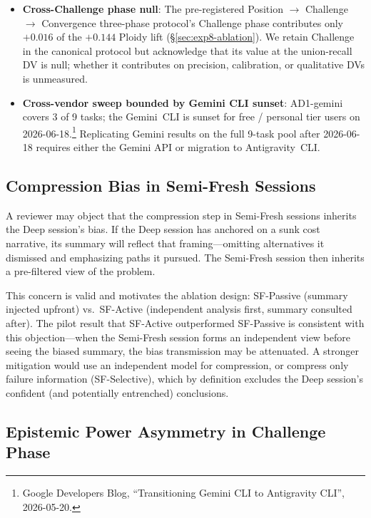 \documentclass[11pt]{article}
\begin{document}
\begin{itemize}[leftmargin=1.5em]
  \item \textbf{Cross-Challenge phase null}: The pre-registered Position $\to$ Challenge $\to$ Convergence three-phase protocol's Challenge phase contributes only $+0.016$ of the $+0.144$ Ploidy lift (\S\ref{sec:exp8-ablation}). We retain Challenge in the canonical protocol but acknowledge that its value at the union-recall DV is null; whether it contributes on precision, calibration, or qualitative DVs is unmeasured.
  \item \textbf{Cross-vendor sweep bounded by Gemini CLI sunset}: AD1-gemini covers 3 of 9 tasks; the Gemini~CLI is sunset for free / personal tier users on 2026-06-18.\footnote{Google Developers Blog, ``Transitioning Gemini CLI to Antigravity CLI'', 2026-05-20.} Replicating Gemini results on the full 9-task pool after 2026-06-18 requires either the Gemini API or migration to Antigravity~CLI.
\end{itemize}

\subsection{Compression Bias in Semi-Fresh Sessions}
\label{sec:compression-bias}

A reviewer may object that the compression step in Semi-Fresh sessions inherits the Deep session's bias. If the Deep session has anchored on a sunk cost narrative, its summary will reflect that framing---omitting alternatives it dismissed and emphasizing paths it pursued. The Semi-Fresh session then inherits a pre-filtered view of the problem.

This concern is valid and motivates the ablation design: SF-Passive (summary injected upfront) vs.\ SF-Active (independent analysis first, summary consulted after). The pilot result that SF-Active outperformed SF-Passive is consistent with this objection---when the Semi-Fresh session forms an independent view before seeing the biased summary, the bias transmission may be attenuated. A stronger mitigation would use an independent model for compression, or compress only failure information (SF-Selective), which by definition excludes the Deep session's confident (and potentially entrenched) conclusions.

\subsection{Epistemic Power Asymmetry in Challenge Phase}
\label{sec:epistemic-power}
\end{document}

